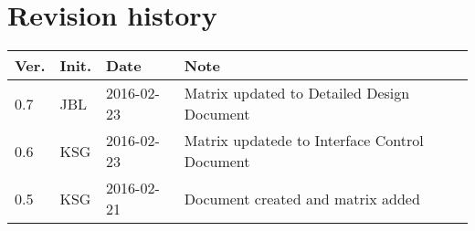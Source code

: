 \chapter*{Revision history}
\label{app:rev_his}


\begin{tabular}{b{1cm} b{1cm} b{2cm} b{8cm}}
    \textbf{Ver.} & \textbf{Init.} & \textbf{Date} & \textbf{Note} \\
    \hline
    0.7 & JBL & 2016-02-23 & Matrix updated to Detailed Design Document\\
    0.6 & KSG & 2016-02-23 & Matrix updatede to Interface Control Document\\
    0.5 & KSG & 2016-02-21 & Document created and matrix added \\
\end{tabular}
